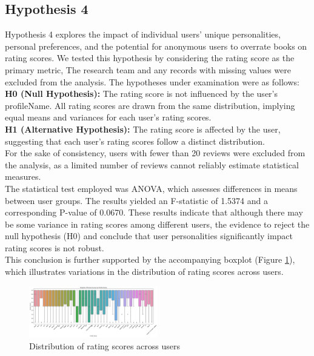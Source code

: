 \subsection*{Hypothesis 4}
Hypothesis 4 explores the impact of individual users' unique personalities, personal preferences,
and the potential for anonymous users to overrate books on rating scores.
We tested this hypothesis by considering the rating score as the primary metric, The research team
and any records with missing values were excluded from the analysis.
The hypotheses under examination were as follows:\\
\textbf{H0 (Null Hypothesis):} The rating score is not influenced by the user's profileName.
All rating scores are drawn from the same distribution, implying equal means and variances for each user's rating scores.\\
\textbf{H1 (Alternative Hypothesis):} The rating score is affected by the user,
suggesting that each user's rating scores follow a distinct distribution.\\
For the sake of consistency, users with fewer than 20 reviews were excluded from the analysis,
as a limited number of reviews cannot reliably estimate statistical measures.\\
The statistical test employed was ANOVA, which assesses differences in means between user groups.
The results yielded an F-statistic of 1.5374 and a corresponding P-value of 0.0670.
These results indicate that although there may be some variance in rating scores among different users,
the evidence to reject the null hypothesis (H0) and conclude that user personalities significantly impact
rating scores is not robust.\\
This conclusion is further supported by the accompanying boxplot (Figure \ref{fig:h4}),
which illustrates variations in the distribution of rating scores across users.
\begin{figure}[H]
    \centering
    \includegraphics[width=0.5\textwidth]{./figures/h4.1.png}
    \caption{Distribution of rating scores across users}
    \label{fig:h4}
\end{figure}
